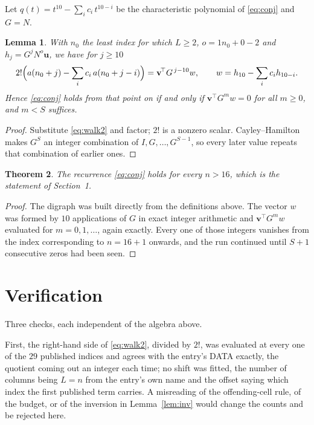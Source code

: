 \documentclass[11pt,a4paper]{article}
\theoremstyle{plain}
\newtheorem{theorem}{Theorem}
\newtheorem{lemma}[theorem]{Lemma}
\theoremstyle{definition}
\begin{document}
Let $q(t)=t^{10}-\sum_i c_i\,t^{10-i}$ be the characteristic polynomial of
\eqref{eq:conj} and $G=N$.

\begin{lemma}\label{lem:crit}
With $n_0$ the least index for which $L\ge2$, $o=1n_0+0-2$ and
$h_j=G^{j}N^{o}\mathbf{u}$, we have for $j\ge10$
\[
2!\Bigl(a(n_0+j)-\sum_i c_i\,a(n_0+j-i)\Bigr)=\mathbf{v}^{\!\top}G^{\,j-10}w,
\qquad w=h_{10}-\sum_i c_i h_{10-i} .
\]
Hence \eqref{eq:conj} holds from that point on if and only if
$\mathbf{v}^{\!\top}G^{m}w=0$ for all $m\ge0$, and $m<S$ suffices.
\end{lemma}

\begin{proof}
Substitute \eqref{eq:walk2} and factor; $2!$ is a nonzero scalar. Cayley--Hamilton
makes $G^{S}$ an integer combination of $I,G,\dots,G^{S-1}$, so every later value repeats
that combination of earlier ones.
\end{proof}

\begin{theorem}
The recurrence \eqref{eq:conj} holds for every $n>16$, which is the statement of
Section~1.
\end{theorem}

\begin{proof}
The digraph was built directly from the definitions above. The vector $w$ was formed by
$10$ applications of $G$ in exact integer arithmetic and $\mathbf{v}^{\!\top}G^{m}w$
evaluated for $m=0,1,\dots$, again exactly. Every one of those integers vanishes from the
index corresponding to $n=16+1$ onwards, and the run continued until $S+1$ consecutive
zeros had been seen.
\end{proof}

\section{Verification}

Three checks, each independent of the algebra above.

First, the right-hand side of \eqref{eq:walk2}, divided by $2!$, was evaluated at every
one of the $29$ published indices and agrees with the entry's DATA exactly, the quotient
coming out an integer each time; no shift was fitted, the number of columns being
$L=n$ from the entry's own name and the offset saying which index the first published
term carries. A misreading of the offending-cell rule, of the budget, or of the inversion in
Lemma~\ref{lem:inv} would change the counts and be rejected here.
\end{document}
